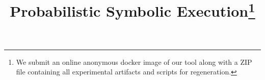 \documentclass[runningheads]{llncs}
\begin{document}
%
\title{Probabilistic Symbolic Execution\thanks{We submit an online anonymous docker image of our tool along with a ZIP file containing all experimental artifacts and scripts for regeneration.}}
%
%
%
%
%
\maketitle              %
%











%
\end{document}
